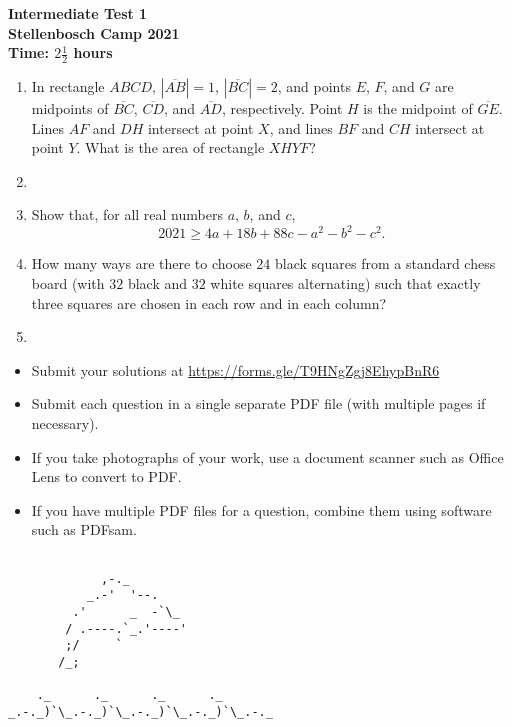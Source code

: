 \documentclass{article}
\begin{document}
\thispagestyle{empty}

\begin{center}
  \textbf{\Large Intermediate Test 1}
  \\ \vspace{1em}
  \textbf{\large Stellenbosch Camp 2021}
  \\ \vspace{1em}
  \textbf{\large Time: $2\frac{1}{2}$ hours}
\end{center}

\vspace{24pt}

\begin{enumerate}[1.]

\item %
In rectangle $ABCD$, $|\overline{AB}|=1$, $|\overline{BC}|=2$, and points $E$, $F$, and $G$ are midpoints of $\overline{BC}$, $\overline{CD}$, and $\overline{AD}$, respectively.
Point $H$ is the midpoint of $\overline{GE}$.
Lines $AF$ and $DH$ intersect at point $X$, and lines $BF$ and $CH$ intersect at point $Y$.
What is the area of rectangle $XHYF$?


\item %


\item %
Show that, for all real numbers $a$, $b$, and $c$,
\[ 2021 \geq 4a + 18b + 88c - a^2 - b^2 - c^2. \]


\item %
How many ways are there to choose $24$ black squares from a standard chess board (with $32$ black and $32$ white squares alternating) such that exactly three squares are chosen in each row and in each column?


\item %

\end{enumerate}


\vfill
\begin{itemize}
	\item Submit your solutions at \href{https://forms.gle/T9HNgZgj8EhypBnR6}{https://forms.gle/T9HNgZgj8EhypBnR6}
	\item Submit each question in a single separate PDF file (with multiple pages if necessary).
	\item If you take photographs of your work, use a document scanner such as Office Lens to convert to PDF.
	\item If you have multiple PDF files for a question, combine them using software such as PDFsam.
\end{itemize}


\vfill

\centering
\begin{BVerbatim}

             ,-._
           _.-'  '--.
         .'      _  -`\_
        / .----.`_.'----'
        ;/     `
       /_;

    ._      ._      ._      ._
_.-._)`\_.-._)`\_.-._)`\_.-._)`\_.-._

\end{BVerbatim}
\end{document}
